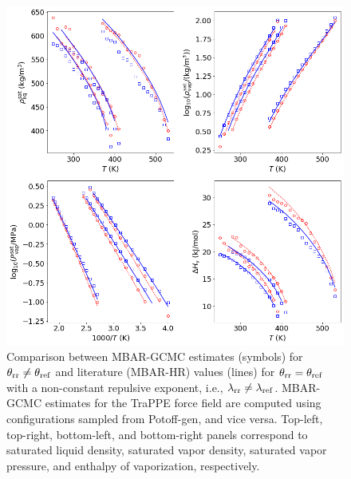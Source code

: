 \documentclass[journal=jced,manuscript=article]{achemso}
\begin{document}
	\begin{figure}[htb!]
		\centering
		\includegraphics[width=6.4in]{refFF_to_rrFF_lam_12to16.png}
		\caption{Comparison between MBAR-GCMC estimates (symbols) for $\theta_{\rm rr} \neq \theta_{\rm ref}$ and literature (MBAR-HR) values (lines) for $\theta_{\rm rr} = \theta_{\rm ref}$ with a non-constant repulsive exponent, i.e., $\lambda_{\rm rr} \neq \lambda_{\rm ref}$. MBAR-GCMC estimates for the TraPPE force field are computed using configurations sampled from Potoff-gen, and vice versa. Top-left, top-right, bottom-left, and bottom-right panels correspond to saturated liquid density, saturated vapor density, saturated vapor pressure, and enthalpy of vaporization, respectively.}
		\label{fig:refFF_to_rrFF_lam12to16}
	\end{figure}
\end{document}

